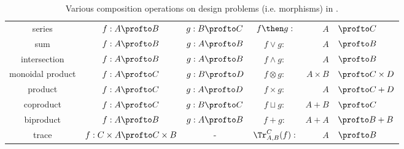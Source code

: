 \begin{table}[t!]
    \centering
\begin{tabular}{c|c|c|crl}
    series &
    $f:A\profto B$&
    $g:B\profto C$&
    $f\then g:$&$A$&$\profto C$ \\
    sum &
    $f:A\profto B$ &
    $g:A\profto B$ &
    $f\vee g:$&$A$&$\profto B$ \\
    intersection &
    $f:A\profto B$ &
    $g:A\profto B$ &
    $f\wedge g:$&$A$&$\profto B$ \\
    monoidal product &
    $f:A\profto C$&
    $g:B\profto D$ &
    $f\otimes g:$&$A\times B$&$\profto C \times D$ \\
    product &
    $f:A\profto C$&
    $g:A\profto D$ &
    $f\times g:$&$A $&$\profto C + D$ \\
    coproduct &
    $f:A\profto C$&
    $g:B\profto C$ &
    $f\sqcup g:$&$A + B $&$\profto C$ \\
    biproduct &
    $f:A\profto B$ &
    $g:A\profto B$ &
    $f+ g:$&$A + A$&$\profto B + B$ \\
    trace &
    $f: C \times A \profto C \times B$ &
    -&
    $\Tr_{A,B}^C(f) :$&$A$&$\profto B$
\end{tabular}
    \caption{Various composition operations on design problems (i.e. morphisms) in \DP.}
\end{table}
